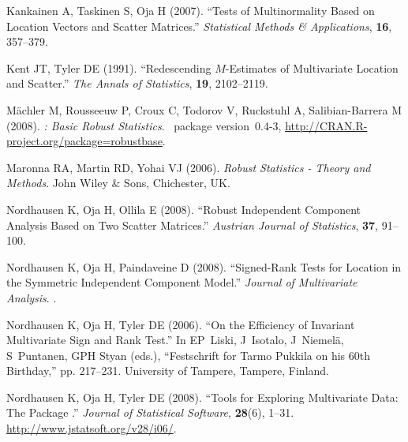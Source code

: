 \documentclass[article,nojss]{jss}
\begin{document}
\begin{thebibliography}{33}
Kankainen A, Taskinen S, Oja H (2007).
\newblock \enquote{Tests of Multinormality Based on Location Vectors and
  Scatter Matrices.}
\newblock \emph{Statistical Methods \& Applications}, \textbf{16}, 357--379.

Kent JT, Tyler DE (1991).
\newblock \enquote{Redescending {$M$}-Estimates of Multivariate Location and
  Scatter.}
\newblock \emph{The Annals of Statistics}, \textbf{19}, 2102--2119.

M{\"a}chler M, Rousseeuw P, Croux C, Todorov V, Ruckstuhl A, Salibian-Barrera M
  (2008).
\newblock \emph{: Basic Robust Statistics}.
\newblock {}~package version~0.4-3,
  \urlprefix\url{http://CRAN.R-project.org/package=robustbase}.

Maronna RA, Martin RD, Yohai VJ (2006).
\newblock \emph{Robust Statistics - Theory and Methods}.
\newblock John Wiley \& Sons, Chichester, UK.

Nordhausen K, Oja H, Ollila E (2008{}).
\newblock \enquote{Robust Independent Component Analysis Based on Two Scatter
  Matrices.}
\newblock \emph{Austrian Journal of Statistics}, \textbf{37}, 91--100.

Nordhausen K, Oja H, Paindaveine D (2008{}).
\newblock \enquote{Signed-Rank Tests for Location in the Symmetric Independent
  Component Model.}
\newblock \emph{Journal of Multivariate Analysis}.
\newblock {}.

Nordhausen K, Oja H, Tyler DE (2006).
\newblock \enquote{On the Efficiency of Invariant Multivariate Sign and Rank
  Test.}
\newblock In EP~Liski, J~Isotalo, J~Niemel{\"a}, S~Puntanen, GPH Styan (eds.),
  \enquote{Festschrift for Tarmo Pukkila on his 60th Birthday,} pp. 217--231.
  University of Tampere, Tampere, Finland.

Nordhausen K, Oja H, Tyler DE (2008{}).
\newblock \enquote{Tools for Exploring Multivariate Data: The Package
  .}
\newblock \emph{Journal of Statistical Software}, \textbf{28}(6), 1--31.
\newblock \urlprefix\url{http://www.jstatsoft.org/v28/i06/}.


\end{thebibliography}
\end{document}
